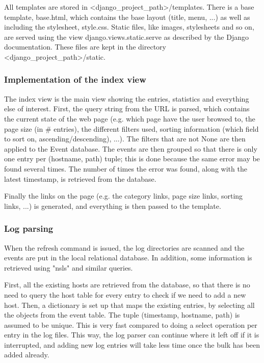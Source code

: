 All templates are stored in <django\_project\_path>/templates. There is a base template, base.html, which contains the base layout (title, menu, ...) as well as including the stylesheet, style.css. Static files, like images, stylesheets and so on, are served using the view django.views.static.serve as described by the Django documentation\cite{django}. These files are kept in the directory <django\_project\_path>/static.

\subsubsection{Implementation of the index view}
The index view is the main view showing the entries, statistics and everything else of interest. First, the query string from the URL is parsed, which contains the current state of the web page (e.g. which page have the user browsed to, the page size (in \# entries), the different filters used, sorting information (which field to sort on, ascending/descending), ...). The filters that are not None are then applied to the Event database. The events are then grouped so that there is only one entry per (hostname, path) tuple; this is done because the same error may be found several times. The number of times the error was found, along with the latest timestamp, is retrieved from the database.

Finally the links on the page (e.g. the category links, page size links, sorting links, ...) is generated, and everything is then passed to the template. 

\subsubsection{Log parsing}
When the refresh command is issued, the log directories are scanned and the events are put in the local relational database. In addition, some information is retrieved using "nsls" and similar queries.

First, all the existing hosts are retrieved from the database, so that there is no need to query the host table for every entry to check if we need to add a new host. Then, a dictionary is set up that maps the existing entries, by selecting all the objects from the event table. The tuple (timestamp, hostname, path) is assumed to be unique. This is very fast compared to doing a select operation per entry in the log files. This way, the log parser can continue where it left off if it is interrupted, and adding new log entries will take less time once the bulk has been added already.

